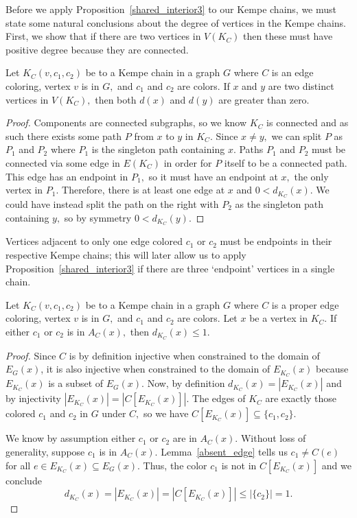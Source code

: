 Before we apply Proposition~\ref{shared_interior3} to our Kempe chains, we must state some natural conclusions about the degree of vertices in the Kempe chains. First, we show that if there are two vertices in $V(K_C)$ then these must have positive degree because they are connected.
\begin{lemma}\label{min_deg_Kempe}
    Let $K_C(v,c_1,c_2)$ be to a Kempe chain in a graph $G$ where $C$ is an edge coloring, vertex $v$ is in $G,$ and $c_1$ and $c_2$ are colors. If $x$ and $y$ are two distinct vertices in $V(K_C),$ then both $d(x)$ and $d(y)$ are greater than zero.
\end{lemma}
\begin{proof}
    Components are connected subgraphs, so we know $K_C$ is connected and as such there exists some path $P$ from $x$ to $y$ in $K_C.$ Since $x \neq y,$ we can split $P$ as $P_1$ and $P_2$ where $P_1$ is the singleton path containing $x.$ Paths $P_1$ and $P_2$ must be connected via some edge in $E(K_C)$ in order for $P$ itself to be a connected path. This edge has an endpoint in $P_1,$ so it must have an endpoint at $x,$ the only vertex in $P_1.$ Therefore, there is at least one edge at $x$ and $0 < d_{K_C}(x).$ We could have instead split the path on the right with $P_2$ as the singleton path containing $y,$ so by symmetry $0 < d_{K_C}(y).$ 
\end{proof}

Vertices adjacent to only one edge colored $c_1$ or $c_2$ must be endpoints in their respective Kempe chains; this will later allow us to apply Proposition~\ref{shared_interior3} if there are three `endpoint' vertices in a single chain.
\begin{lemma}\label{deg_chain_endpt}
     Let $K_C(v,c_1,c_2)$ be to a Kempe chain in a graph $G$ where $C$ is a proper edge coloring, vertex $v$ is in $G,$ and $c_1$ and $c_2$ are colors. Let $x$ be a vertex in $K_C.$ If either $c_1$ or $c_2$ is in $A_C(x),$ then $d_{K_C}(x) \leq 1.$
\end{lemma}
\begin{proof}
    Since $C$ is by definition injective when constrained to the domain of $E_G(x)$, it is also injective when constrained to the domain of $E_{K_C}(x)$ because $E_{K_C}(x)$ is a subset of $E_G(x).$ Now, by definition $d_{K_C}(x) = |E_{K_C}(x)|$ and by injectivity $|E_{K_C}(x)| = |C[E_{K_C}(x)]|.$ The edges of $K_C$ are exactly those colored $c_1$ and $c_2$ in $G$ under $C,$ so we have $C[E_{K_C}(x)] \subseteq \{c_1, c_2\}.$ 
    
    We know by assumption either $c_1$ or $c_2$ are in $A_C(x).$ Without loss of generality, suppose $c_1$ is in $A_C(x).$ Lemma~\ref{absent_edge} tells us $c_1 \neq C(e)$ for all $e \in E_{K_C}(x) \subseteq E_G(x).$ Thus, the color $c_1$ is not in $C[E_{K_C}(x)]$ and we conclude 
    $$d_{K_C}(x) = |E_{K_C}(x)| = |C[E_{K_C}(x)]| \leq |\{c_2\}| = 1.$$
\end{proof}

